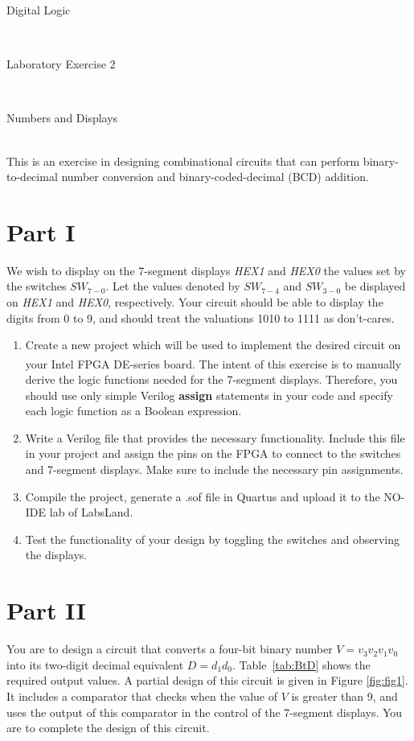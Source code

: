 \documentclass[epsfig,10pt,fullpage]{article}
\newcommand{\LabNum}{2}
\begin{document}
\centerline{\huge Digital Logic}
~\\
\centerline{\huge Laboratory Exercise \LabNum}
~\\
\centerline{\large Numbers and Displays}
~\\

This is an exercise in designing combinational circuits that can perform
binary-to-decimal number conversion and binary-coded-decimal (BCD) addition.
~\\

\section*{Part I}
We wish to display on the 7-segment displays {\it HEX1} and {\it HEX0} the 
values set by the switches $SW_{7-0}$. 
Let the values denoted by $SW_{7-4}$ and $SW_{3-0}$ be displayed on {\it HEX1} and {\it HEX0}, 
respectively.
Your circuit should be able to display the digits from 0 to 9, and should treat the
valuations 1010 to 1111 as don't-cares.

\begin{enumerate}
\item Create a new project which will be used to implement the desired
circuit on your Intel\textsuperscript{\textregistered} FPGA DE-series board. The intent of this exercise is to manually 
derive the logic functions needed for the 7-segment displays. Therefore, you should use only
simple Verilog {\bf assign} statements in your code and specify each logic function as
a Boolean expression.
\item Write a Verilog file that provides the necessary functionality. Include this 
file in your project and assign the pins on the FPGA to connect to the 
switches and 7-segment displays. Make sure to include the necessary pin assignments.
\item Compile the project, generate a .sof file in Quartus and upload it to the NO-IDE lab of LabsLand.
\item Test the functionality of your design by toggling the switches
and observing the displays.
\end{enumerate}

\section*{Part II}
You are to design a circuit that converts a four-bit binary number $V = v_3 v_2 v_1 v_0$
into its two-digit decimal equivalent $D = d_1 d_0$. Table~\ref{tab:BtD} shows the required output
values. A partial design of this circuit is given in Figure \ref{fig:fig1}. It includes a comparator
that checks when the value of $V$ is greater than 9, and uses the output of this
comparator in the control of the 7-segment displays. You are to complete the design of
this circuit. 
\end{document}
